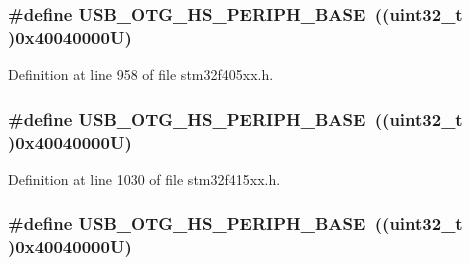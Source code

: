 \subsubsection[{\texorpdfstring{U\+S\+B\+\_\+\+O\+T\+G\+\_\+\+H\+S\+\_\+\+P\+E\+R\+I\+P\+H\+\_\+\+B\+A\+SE}{USB_OTG_HS_PERIPH_BASE}}]{\setlength{\rightskip}{0pt plus 5cm}\#define U\+S\+B\+\_\+\+O\+T\+G\+\_\+\+H\+S\+\_\+\+P\+E\+R\+I\+P\+H\+\_\+\+B\+A\+SE~((uint32\+\_\+t )0x40040000\+U)}\hypertarget{group___peripheral__registers__structures_gaa405d2ebfd7e9394237b6639f16a5409}{}\label{group___peripheral__registers__structures_gaa405d2ebfd7e9394237b6639f16a5409}


Definition at line 958 of file stm32f405xx.\+h.

\subsubsection[{\texorpdfstring{U\+S\+B\+\_\+\+O\+T\+G\+\_\+\+H\+S\+\_\+\+P\+E\+R\+I\+P\+H\+\_\+\+B\+A\+SE}{USB_OTG_HS_PERIPH_BASE}}]{\setlength{\rightskip}{0pt plus 5cm}\#define U\+S\+B\+\_\+\+O\+T\+G\+\_\+\+H\+S\+\_\+\+P\+E\+R\+I\+P\+H\+\_\+\+B\+A\+SE~((uint32\+\_\+t )0x40040000\+U)}\hypertarget{group___peripheral__registers__structures_gaa405d2ebfd7e9394237b6639f16a5409}{}\label{group___peripheral__registers__structures_gaa405d2ebfd7e9394237b6639f16a5409}


Definition at line 1030 of file stm32f415xx.\+h.

\subsubsection[{\texorpdfstring{U\+S\+B\+\_\+\+O\+T\+G\+\_\+\+H\+S\+\_\+\+P\+E\+R\+I\+P\+H\+\_\+\+B\+A\+SE}{USB_OTG_HS_PERIPH_BASE}}]{\setlength{\rightskip}{0pt plus 5cm}\#define U\+S\+B\+\_\+\+O\+T\+G\+\_\+\+H\+S\+\_\+\+P\+E\+R\+I\+P\+H\+\_\+\+B\+A\+SE~((uint32\+\_\+t )0x40040000\+U)}\hypertarget{group___peripheral__registers__structures_gaa405d2ebfd7e9394237b6639f16a5409}{}\label{group___peripheral__registers__structures_gaa405d2ebfd7e9394237b6639f16a5409}


